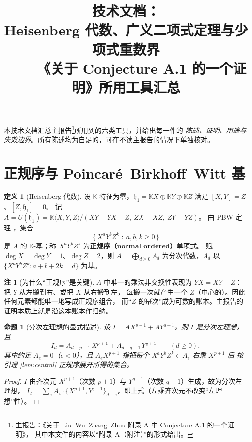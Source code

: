 \documentclass[11pt,UTF8]{ctexart}
\title{\bfseries 技术文档：\\
Heisenberg 代数、广义二项式定理与少项式重数界\\
\large ——《关于 Conjecture A.1 的一个证明》所用工具汇总}
\author{}
\date{}
\newtheorem{proposition}[theorem]{命题}
\theoremstyle{definition}
\newtheorem{definition}[theorem]{定义}
\newtheorem{remark}[theorem]{注}
\newcommand{\K}{\mathbb{K}}
\newcommand{\hh}{\mathfrak{h}}
\begin{document}
\maketitle

\noindent
本技术文档汇总主报告\footnote{主报告：《关于 Liu--Wu--Zhang--Zhou 附录 A 中 Conjecture A.1 的一个证明》，
其中本文件的内容以“附录 A（附注）”的形式给出。}所用到的六类工具，并给出每一件的
\emph{陈述、证明、用途与失效边界}。所有陈述均为自足的，可在不读主报告的情况下单独核对。

\tableofcontents

\section{正规序与 Poincar\'e--Birkhoff--Witt 基}\label{sec:pbw}

\begin{definition}[Heisenberg 代数]
设 $\K$ 特征为零，$\hh_1=\K X\oplus\K Y\oplus\K Z$ 满足 $[X,Y]=Z$、$[Z,\hh_1]=0$。
记 $A=U(\hh_1)=\K\langle X,Y,Z\rangle/(XY-YX-Z,\ ZX-XZ,\ ZY-YZ)$。
由 PBW 定理 \cite{Dixmier}，集合
\[
\{\,X^{a}Y^{b}Z^{k}\;:\;a,b,k\ge0\,\}
\]
是 $A$ 的 $\K$-基；称 $X^{a}Y^{b}Z^{k}$ 为\textbf{正规序（normal ordered）}单项式。
赋 $\deg X=\deg Y=1$、$\deg Z=2$，则 $A=\bigoplus_{d\ge0}A_d$ 为分次代数，$A_d$ 以
$\{X^aY^bZ^k: a+b+2k=d\}$ 为基。
\end{definition}

\begin{remark}[为什么“正规序”是关键]
$A$ 中唯一的乘法非交换性表现为 $YX=XY-Z$：把 $Y$ 从左搬到右、或把 $X$ 从右搬到左，
每搬一次就产生一个 $Z$（中心的）。因此任何元素都能唯一地写成正规序组合，
而“$Z$ 的幂次”成为可数的账本。主报告的证明本质上就是沿这本账本作归纳。
\end{remark}

\begin{proposition}[分次左理想的显式描述]\label{prop:graded}
设 $I=AX^{p+1}+AY^{q+1}$。则 $I$ 是分次左理想，且
\[
I_d=A_{d-p-1}\,X^{p+1}+A_{d-q-1}\,Y^{q+1}\qquad(d\ge0),
\]
其中约定 $A_{e}=0$（$e<0$），且 $A_eX^{p+1}$ 指把每个 $X^aY^bZ^k\in A_e$ 右乘 $X^{p+1}$ 后
按引理 \ref{lem:central} 正规序展开所得的集合。
\end{proposition}

\begin{proof}
$I$ 由齐次元 $X^{p+1}$（次数 $p+1$）与 $Y^{q+1}$（次数 $q+1$）生成，故为分次左理想，
$I_d=\sum_{e}A_e\cdot\{X^{p+1},Y^{q+1}\}_{d-e}$，即上式（左乘齐次元不改变“左理想”性）。
\end{proof}
\end{document}
